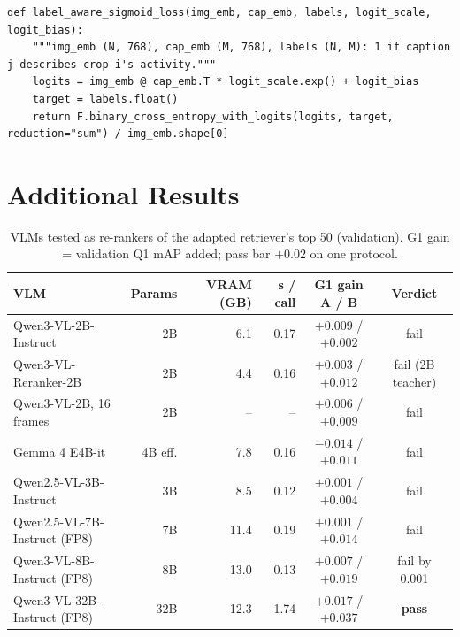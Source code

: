 \documentclass[11pt,a4paper]{article}
\begin{document}
\begin{lstlisting}[caption={Label-aware sigmoid loss for the LoRA training, \texttt{sfs/train/loss.py} (Eq.~1).}]
def label_aware_sigmoid_loss(img_emb, cap_emb, labels, logit_scale, logit_bias):
    """img_emb (N, 768), cap_emb (M, 768), labels (N, M): 1 if caption j describes crop i's activity."""
    logits = img_emb @ cap_emb.T * logit_scale.exp() + logit_bias
    target = labels.float()
    return F.binary_cross_entropy_with_logits(logits, target, reduction="sum") / img_emb.shape[0]
\end{lstlisting}

\section{Additional Results}\label{app:more}

\begin{table}[H]
\centering
\caption[VLMs tested as re-rankers (gate G1).]{VLMs tested as re-rankers of the adapted retriever's top 50 (validation). G1 gain = validation Q1 mAP added; pass bar $+0.02$ on one protocol.}\label{tab:gates}
\footnotesize
\setlength{\tabcolsep}{4pt}
\begin{tabular}{lrrrcc}
\toprule
\textbf{VLM} & \textbf{Params} & \textbf{VRAM (GB)} & \textbf{s / call} & \textbf{G1 gain A / B} & \textbf{Verdict} \\
\midrule
Qwen3-VL-2B-Instruct & 2B & 6.1 & 0.17 & $+0.009$ / $+0.002$ & fail \\
Qwen3-VL-Reranker-2B & 2B & 4.4 & 0.16 & $+0.003$ / $+0.012$ & fail (2B teacher) \\
Qwen3-VL-2B, 16 frames & 2B & -- & -- & $+0.006$ / $+0.009$ & fail \\
Gemma 4 E4B-it & 4B eff. & 7.8 & 0.16 & $-0.014$ / $+0.011$ & fail \\
Qwen2.5-VL-3B-Instruct & 3B & 8.5 & 0.12 & $+0.001$ / $+0.004$ & fail \\
Qwen2.5-VL-7B-Instruct (FP8) & 7B & 11.4 & 0.19 & $+0.001$ / $+0.014$ & fail \\
Qwen3-VL-8B-Instruct (FP8) & 8B & 13.0 & 0.13 & $+0.007$ / $+0.019$ & fail by 0.001 \\
Qwen3-VL-32B-Instruct (FP8) & 32B & 12.3 & 1.74 & $+0.017$ / $+0.037$ & \textbf{pass} \\
\bottomrule
\end{tabular}
\end{table}
\end{document}
